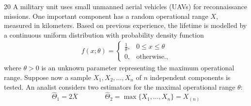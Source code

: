 \begin{enquestion}{20}{
    A military unit uses small unmanned aerial vehicles (UAVs) for reconnaissance missions.
    One important component has a random operational range $X$, measured in kilometers.
    Based on previous experience, the lifetime is modelled by a continuous uniform distribution with probability density function
    \begin{align*}
        f(x; \theta)
        =
        \begin{cases}
            \frac{1}{\theta}, & 0 \leq x \leq \theta \\
            0, & \text{otherwise.},
        \end{cases}
    \end{align*}
    where $\theta > 0$ is an unknown parameter representing the maximum operational range.
    Suppose now a sample $X_1, X_2, \ldots, X_n$ of $n$ independent components is tested.
    An analist considers two estimators for the maximal operational range $\theta$:
    \[  \hat{\Theta}_1 = 2 \overline{X} \qquad \qquad \hat{\Theta}_2 = \max\{X_1, \ldots, X_n\} = X_{(n)} \]
}



\end{enquestion}
